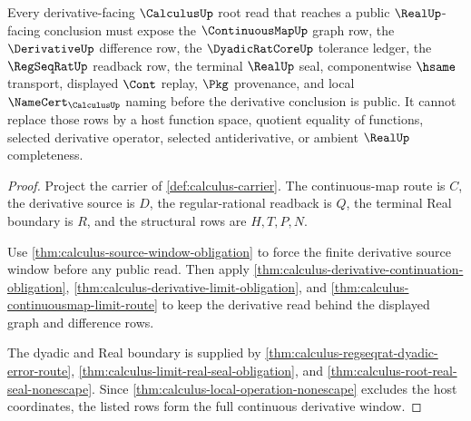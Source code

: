 \begin{theorem}
\label{thm:calculus-root-unblock-continuous-derivative-window}
Every derivative-facing $\CalculusUp$ root read that reaches a public $\RealUp$-facing conclusion must expose the $\ContinuousMapUp$ graph row, the $\DerivativeUp$ difference row, the $\DyadicRatCoreUp$ tolerance ledger, the $\RegSeqRatUp$ readback row, the terminal $\RealUp$ seal, componentwise $\hsame$ transport, displayed $\Cont$ replay, $\Pkg$ provenance, and local $\NameCert_{\CalculusUp}$ naming before the derivative conclusion is public. It cannot replace those rows by a host function space, quotient equality of functions, selected derivative operator, selected antiderivative, or ambient $\RealUp$ completeness.
\end{theorem}
\begin{proof}
Project the carrier of \autoref{def:calculus-carrier}. The continuous-map route is $C$, the derivative source is $D$, the regular-rational readback is $Q$, the terminal Real boundary is $R$, and the structural rows are $H,T,P,N$.

Use \autoref{thm:calculus-source-window-obligation} to force the finite derivative source window before any public read. Then apply \autoref{thm:calculus-derivative-continuation-obligation}, \autoref{thm:calculus-derivative-limit-obligation}, and \autoref{thm:calculus-continuousmap-limit-route} to keep the derivative read behind the displayed graph and difference rows.

The dyadic and Real boundary is supplied by \autoref{thm:calculus-regseqrat-dyadic-error-route}, \autoref{thm:calculus-limit-real-seal-obligation}, and \autoref{thm:calculus-root-real-seal-nonescape}. Since \autoref{thm:calculus-local-operation-nonescape} excludes the host coordinates, the listed rows form the full continuous derivative window.
\end{proof}

